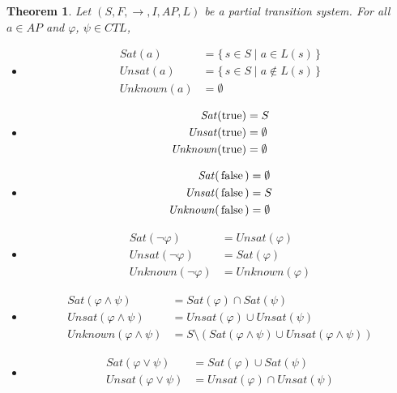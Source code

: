 \documentclass[12pt]{article}
\newcommand{\TRUE}{\mbox{\lstinline{true}}}
\newcommand{\FALSE}{\mbox{\lstinline{false}}}
\newtheorem{theorem}{Theorem}
\theoremstyle{definition}
\begin{document}
\begin{theorem}
Let $(S, F, \rightarrow, I, \mathit{AP}, L)$ be a partial transition system.  For all $a \in \mathit{AP}$ and $\varphi$, $\psi \in \mathit{CTL}$,
\begin{itemize}
\item
\begin{align*}
\mathit{Sat}(a) & = \{\, s \in S \mid a \in L(s) \,\}\\
\mathit{Unsat}(a) & = \{\, s \in S \mid a \not\in L(s) \,\}\\
\mathit{Unknown}(a) & = \emptyset
\end{align*}
\item 
\begin{align*}
\mathit{Sat}(\TRUE) & = S\\
\mathit{Unsat}(\TRUE) & = \emptyset\\
\mathit{Unknown}(\TRUE) & = \emptyset
\end{align*}
\item 
\begin{align*}
\mathit{Sat}(\FALSE) & = \emptyset\\
\mathit{Unsat}(\FALSE) & = S\\
\mathit{Unknown}(\FALSE) & = \emptyset 
\end{align*}
\item
\begin{align*}
\mathit{Sat}(\neg \varphi) & = \mathit{Unsat}(\varphi)\\
\mathit{Unsat}(\neg \varphi) & = \mathit{Sat}(\varphi)\\
\mathit{Unknown}(\neg \varphi) & = \mathit{Unknown}(\varphi)
\end{align*}
\item
\begin{align*}
\mathit{Sat}(\varphi \wedge \psi) & = \mathit{Sat}(\varphi) \cap \mathit{Sat}(\psi)\\
\mathit{Unsat}(\varphi \wedge \psi) & = \mathit{Unsat}(\varphi) \cup \mathit{Unsat}(\psi)\\
\mathit{Unknown}(\varphi \wedge \psi) & = S \setminus (\mathit{Sat}(\varphi \wedge \psi) \cup \mathit{Unsat}(\varphi \wedge \psi))
\end{align*}
\item
\begin{align*}
\mathit{Sat}(\varphi \vee \psi) & = \mathit{Sat}(\varphi) \cup \mathit{Sat}(\psi)\\
\mathit{Unsat}(\varphi \vee \psi) & = \mathit{Unsat}(\varphi) \cap \mathit{Unsat}(\psi)\\

\end{align*}
\end{itemize}
\end{theorem}
\end{document}
